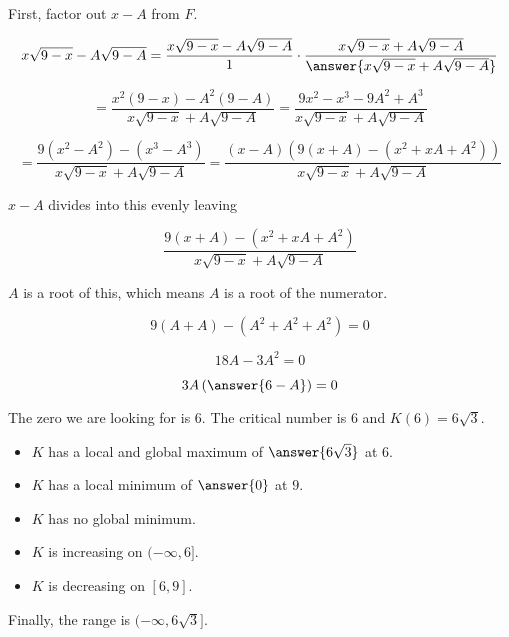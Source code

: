 \documentclass{ximera}
\begin{document}
\begin{procedure}
First, factor out $x-A$ from $F$.


\[
x\sqrt{9-x} - A\sqrt{9-A} = \frac{x\sqrt{9-x} - A\sqrt{9-A}}{1} \cdot \frac{x\sqrt{9-x} + A\sqrt{9-A}}{\answer{x\sqrt{9-x} + A\sqrt{9-A}}}
\]

\[
= \frac{x^2 (9-x) - A^2 (9-A)}{x\sqrt{9-x} + A\sqrt{9-A}} = \frac{9x^2 - x^3 - 9A^2 + A^3}{x\sqrt{9-x} + A\sqrt{9-A}}
\]


\[
= \frac{9(x^2-A^2) - (x^3 - A^3)}{x\sqrt{9-x} + A\sqrt{9-A}} = \frac{(x-A)(9(x+A)-(x^2 + xA + A^2))}{x\sqrt{9-x} + A\sqrt{9-A}}
\]


$x-A$ divides into this evenly leaving

\[
\frac{9(x+A)-(x^2 + xA + A^2)}{x\sqrt{9-x} + A\sqrt{9-A}}
\]

$A$ is a root of this, which means $A$ is a root of the numerator.


\[
9(A+A)-(A^2 + A^2 + A^2) = 0
\]

\[
18A - 3A^2 = 0
\]

\[
3A \left(\answer{6-A} \right) = 0
\]


The zero we are looking for is $6$.
The critical number is $6$ and $K(6) = 6 \sqrt{3}$.


\end{procedure}


\begin{itemize}
\item $K$ has a local and global maximum of $\answer{6\sqrt{3}}$ at $6$.
\item $K$ has a local minimum of $\answer{0}$ at $9$.
\item $K$ has no global minimum.
\end{itemize}




\begin{itemize}
\item $K$ is increasing on $(-\infty, 6]$.
\item $K$ is decreasing on $[6, 9]$.
\end{itemize}


Finally, the range is $(-\infty, 6\sqrt{3}]$. \\
\end{document}
